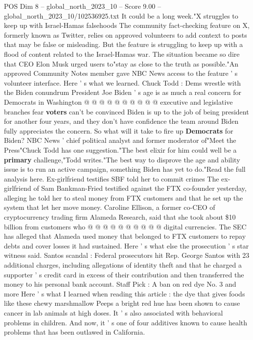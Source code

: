 \begin{textsample}{POS Dim 8 – global\_north\_2023\_10 – Score 9.00 – global\_north\_2023\_10/102536925.txt}
It could be a long week."X struggles to keep up with Israel-Hamas falsehoods The community fact-checking feature on X, formerly known as Twitter, relies on approved volunteers to add context to posts that may be false or misleading.
But the feature is struggling to keep up with a flood of content related to the Israel-Hamas war.
The situation became so dire that CEO Elon Musk urged users to"stay as close to the truth as possible."An approved Community Notes member gave NBC News access to the feature ' s volunteer interface.
Here ' s what we learned.
Chuck Todd : Dems wrestle with the Biden conundrum President Joe Biden ' s age is as much a real concern for Democrats in Washington @ @ @ @ @ @ @ @ @ @ executive and legislative branches fear \textbf{voters} can't be convinced Biden is up to the job of being president for another four years, and they don't have confidence the team around Biden fully appreciates the concern.
So what will it take to fire up \textbf{Democrats} for Biden?
NBC News ' chief political analyst and former moderator of"Meet the Press"Chuck Todd has one suggestion."The best elixir for him could well be a \textbf{primary} challenge,"Todd writes."The best way to disprove the age and ability issue is to run an active campaign, something Biden has yet to do."Read the full analysis here.
Ex-girlfriend testifies SBF told her to commit crimes The ex-girlfriend of Sam Bankman-Fried testified against the FTX co-founder yesterday, alleging he told her to steal money from FTX customers and that he set up the system that let her move money.
Caroline Ellison, a former co-CEO of cryptocurrency trading firm Alameda Research, said that she took about \$10 billion from customers who @ @ @ @ @ @ @ @ @ @ digital currencies.
The SEC has alleged that Alameda used money that belonged to FTX customers to repay debts and cover losses it had sustained.
Here ' s what else the prosecution ' s star witness said.
Santos scandal : Federal prosecutors hit Rep.
George Santos with 23 additional charges, including allegations of identity theft and that he charged a supporter ' s credit card in excess of their contribution and then transferred the money to his personal bank account.
Staff Pick : A ban on red dye No. 3 and more Here ' s what I learned when reading this article : the dye that gives foods like these chewy marshmallow Peeps a bright red hue has been shown to cause cancer in lab animals at high doses.
It ' s also associated with behavioral problems in children.
And now, it ' s one of four additives known to cause health problems that has been outlawed in California.

\end{textsample}
